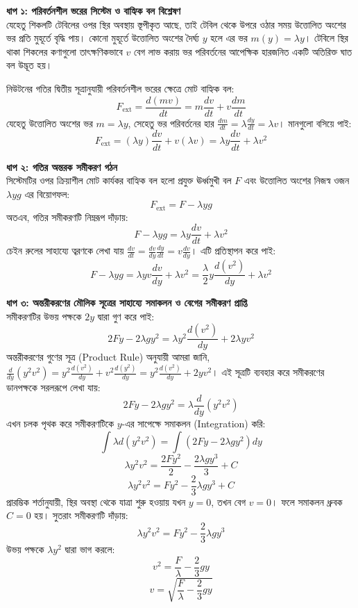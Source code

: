 \documentclass[12pt, a4paper]{article}
\begin{document}
\vspace{1em}
\begin{tcolorbox}[solutionbox={সমাধান (Solution)}]
\noindent
\textbf{ধাপ ১: পরিবর্তনশীল ভরের সিস্টেম ও বাহ্যিক বল বিশ্লেষণ} \\
যেহেতু শিকলটি টেবিলের ওপর স্থির অবস্থায় স্তূপীকৃত আছে, তাই টেবিল থেকে উপরে ওঠার সময় উত্তোলিত অংশের ভর প্রতি মুহূর্তে বৃদ্ধি পায়। কোনো মুহূর্তে উত্তোলিত অংশের দৈর্ঘ্য $y$ হলে এর ভর $m(y) = \lambda y$। টেবিলে স্থির থাকা শিকলের কণাগুলো তাৎক্ষণিকভাবে $v$ বেগ লাভ করায় ভর পরিবর্তনের আপেক্ষিক হারজনিত একটি অতিরিক্ত ঘাত বল উদ্ভূত হয়। 

নিউটনের গতির দ্বিতীয় সূত্রানুযায়ী পরিবর্তনশীল ভরের ক্ষেত্রে মোট বাহ্যিক বল:
\[ F_{\text{ext}} = \frac{d(m v)}{dt} = m \frac{dv}{dt} + v \frac{dm}{dt} \]
যেহেতু উত্তোলিত অংশের ভর $m = \lambda y$, সেহেতু ভর পরিবর্তনের হার $\frac{dm}{dt} = \lambda \frac{dy}{dt} = \lambda v$। মানগুলো বসিয়ে পাই:
\[ F_{\text{ext}} = (\lambda y) \frac{dv}{dt} + v (\lambda v) = \lambda y \frac{dv}{dt} + \lambda v^2 \]

\vspace{0.5em}
\noindent
\textbf{ধাপ ২: গতির অন্তরক সমীকরণ গঠন} \\
সিস্টেমটির ওপর ক্রিয়াশীল মোট কার্যকর বাহ্যিক বল হলো প্রযুক্ত ঊর্ধ্বমুখী বল $F$ এবং উত্তোলিত অংশের নিজস্ব ওজন $\lambda y g$ এর বিয়োগফল:
\[ F_{\text{ext}} = F - \lambda y g \]
অতএব, গতির সমীকরণটি নিম্নরূপ দাঁড়ায়:
\[ F - \lambda y g = \lambda y \frac{dv}{dt} + \lambda v^2 \]
চেইন রুলের সাহায্যে ত্বরণকে লেখা যায় $\frac{dv}{dt} = \frac{dv}{dy} \frac{dy}{dt} = v \frac{dv}{dy}$। এটি প্রতিস্থাপন করে পাই:
\[ F - \lambda y g = \lambda y v \frac{dv}{dy} + \lambda v^2 = \frac{\lambda}{2} y \frac{d(v^2)}{dy} + \lambda v^2 \]

\vspace{0.5em}
\noindent
\textbf{ধাপ ৩: অন্তরীকরণের মৌলিক সূত্রের সাহায্যে সমাকলন ও বেগের সমীকরণ প্রাপ্তি} \\
সমীকরণটির উভয় পক্ষকে $2y$ দ্বারা গুণ করে পাই:
\[ 2Fy - 2\lambda g y^2 = \lambda y^2 \frac{d(v^2)}{dy} + 2\lambda y v^2 \]
অন্তরীকরণের গুণের সূত্র (Product Rule) অনুযায়ী আমরা জানি, $\frac{d}{dy}(y^2 v^2) = y^2 \frac{d(v^2)}{dy} + v^2 \frac{d(y^2)}{dy} = y^2 \frac{d(v^2)}{dy} + 2y v^2$। 
এই সূত্রটি ব্যবহার করে সমীকরণের ডানপক্ষকে সরলরূপে লেখা যায়:
\[ 2Fy - 2\lambda g y^2 = \lambda \frac{d}{dy}(y^2 v^2) \]
এখন চলক পৃথক করে সমীকরণটিকে $y$-এর সাপেক্ষে সমাকলন (Integration) করি:
\[ \int \lambda d(y^2 v^2) = \int (2Fy - 2\lambda g y^2) dy \]
\[ \lambda y^2 v^2 = \frac{2F y^2}{2} - \frac{2\lambda g y^3}{3} + C \]
\[ \lambda y^2 v^2 = F y^2 - \frac{2}{3} \lambda g y^3 + C \]
প্রারম্ভিক শর্তানুযায়ী, স্থির অবস্থা থেকে যাত্রা শুরু হওয়ায় যখন $y = 0$, তখন বেগ $v = 0$। ফলে সমাকলন ধ্রুবক $C = 0$ হয়। সুতরাং সমীকরণটি দাঁড়ায়:
\[ \lambda y^2 v^2 = F y^2 - \frac{2}{3} \lambda g y^3 \]
উভয় পক্ষকে $\lambda y^2$ দ্বারা ভাগ করলে:
\[ v^2 = \frac{F}{\lambda} - \frac{2}{3} g y \]
\[ v = \sqrt{\frac{F}{\lambda} - \frac{2}{3}gy} \]
\end{tcolorbox}
\end{document}
